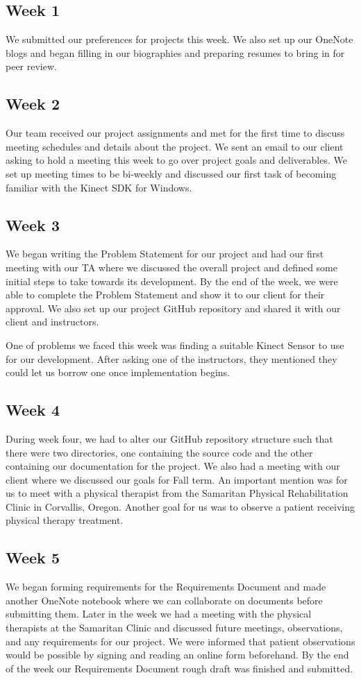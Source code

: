 \documentclass[onecolumn, draftclsnofoot,10pt, compsoc]{IEEEtran}
\begin{document}
\subsection{Week 1}
We submitted our preferences for projects this week. We also set up our OneNote blogs and began filling in our biographies and preparing resumes to bring in for peer review. 

\subsection{Week 2}
Our team received our project assignments and met for the first time to discuss meeting schedules and details about the project. We sent an email to our client asking to hold a meeting this week to go over project goals and deliverables. We set up meeting times to be bi-weekly and discussed our first task of becoming familiar with the Kinect SDK for Windows. 

\subsection{Week 3}
We began writing the Problem Statement for our project and had our first meeting with our TA where we discussed the overall project and defined some initial steps to take towards its development. By the end of the week, we were able to complete the Problem Statement and show it to our client for their approval. We also set up our project GitHub repository and shared it with our client and instructors. 

One of problems we faced this week was finding a suitable Kinect Sensor to use for our development. After asking one of the instructors, they mentioned they could let us borrow one once implementation begins. 

\subsection{Week 4}
During week four, we had to alter our GitHub repository structure such that there were two directories, one containing the source code and the other containing our documentation for the project. We also had a meeting with our client where we discussed our goals for Fall term. An important mention was for us to meet with a physical therapist from the Samaritan Physical Rehabilitation Clinic in Corvallis, Oregon. Another goal for us was to observe a patient receiving physical therapy treatment. 

\subsection{Week 5}
We began forming requirements for the Requirements Document and made another OneNote notebook where we can collaborate on documents before submitting them. Later in the week we had a meeting with the physical therapists at the Samaritan Clinic and discussed future meetings, observations, and any requirements for our project. We were informed that patient observations would be possible by signing and reading an online form beforehand. By the end of the week our Requirements Document rough draft was finished and submitted. 
 
\end{document}
